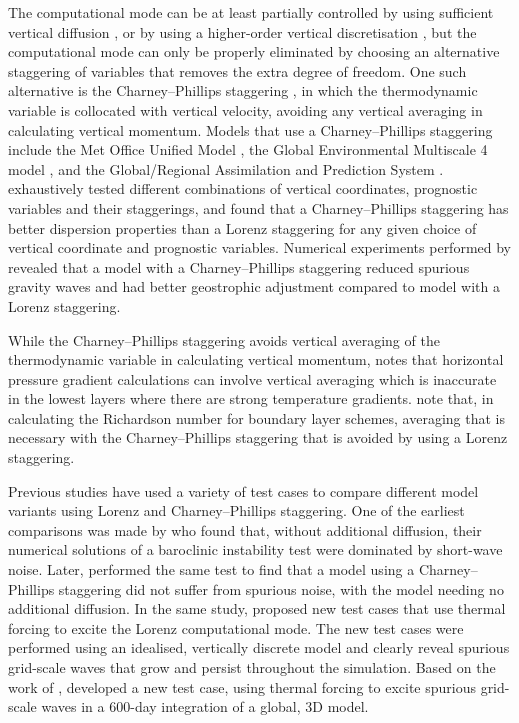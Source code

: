 The computational mode can be at least partially controlled by using sufficient vertical diffusion \citep{chang1992,zadra2004}, or by using a higher-order vertical discretisation \citep{untch-hortal2004,guerra-ullrich2016,yi-park2017}, but the computational mode can only be properly eliminated by choosing an alternative staggering of variables that removes the extra degree of freedom.
One such alternative is the Charney--Phillips staggering \citep{charney-phillips1953}, in which the thermodynamic variable is collocated with vertical velocity, avoiding any vertical averaging in calculating vertical momentum.
Models that use a Charney--Phillips staggering include the Met Office Unified Model \citep{davies2005}, the Global Environmental Multiscale 4 model \citep{girard2014}, and the Global/Regional Assimilation and Prediction System \citep{yang2007}.
\citet{thuburn-woolings2005} exhaustively tested different combinations of vertical coordinates, prognostic variables and their staggerings, and found that a Charney--Phillips staggering has better dispersion properties than a Lorenz staggering for any given choice of vertical coordinate and prognostic variables.
Numerical experiments performed by \citet{cullen1997} revealed that a model with a Charney--Phillips staggering reduced spurious gravity waves and had better geostrophic adjustment compared to  model with a Lorenz staggering.

While the Charney--Phillips staggering avoids vertical averaging of the thermodynamic variable in calculating vertical momentum, \citet{davies2005} notes that horizontal pressure gradient calculations can involve vertical averaging which is inaccurate in the lowest layers where there are strong temperature gradients.
\citet{holdaway2013a} note that, in calculating the Richardson number for boundary layer schemes, averaging that is necessary with the Charney--Phillips staggering that is avoided by using a Lorenz staggering.

Previous studies have used a variety of test cases to compare different model variants using Lorenz and Charney--Phillips staggering.
One of the earliest comparisons was made by \citet{arakawa-moorthi1988} who found that, without additional diffusion, their numerical solutions of a baroclinic instability test were dominated by short-wave noise.
Later, \citet{arakawa-konor1996} performed the same test to find that a model using a Charney--Phillips staggering did not suffer from spurious noise, with the model needing no additional diffusion.
In the same study, \citet{arakawa-konor1996} proposed new test cases that use thermal forcing to excite the Lorenz computational mode.
The new test cases were performed using an idealised, vertically discrete model and clearly reveal spurious grid-scale waves that grow and persist throughout the simulation.
Based on the work of \citet{arakawa-konor1996}, \citet{untch-hortal2004} developed a new test case, using thermal forcing to excite spurious grid-scale waves in a 600-day integration of a global, 3D model.

